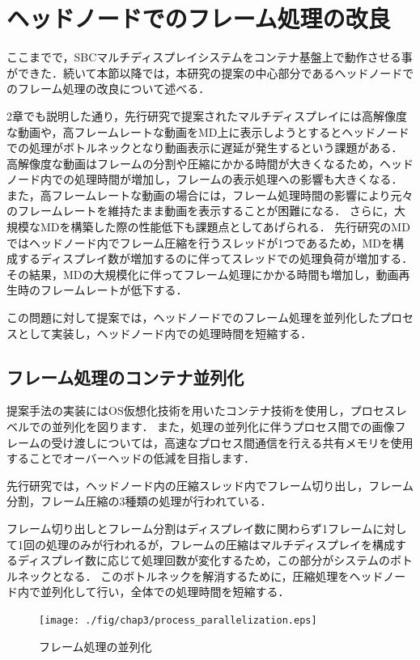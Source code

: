 \section{ヘッドノードでのフレーム処理の改良}
ここまでで，SBCマルチディスプレイシステムをコンテナ基盤上で動作させる事ができた．続いて本節以降では，本研究の提案の中心部分であるヘッドノードでのフレーム処理の改良について述べる．

2章でも説明した通り，先行研究で提案されたマルチディスプレイには高解像度な動画や，高フレームレートな動画をMD上に表示しようとするとヘッドノードでの処理がボトルネックとなり動画表示に遅延が発生するという課題がある．
高解像度な動画はフレームの分割や圧縮にかかる時間が大きくなるため，ヘッドノード内での処理時間が増加し，フレームの表示処理への影響も大きくなる．
また，高フレームレートな動画の場合には，フレーム処理時間の影響により元々のフレームレートを維持たまま動画を表示することが困難になる．
さらに，大規模なMDを構築した際の性能低下も課題点としてあげられる．
先行研究のMDではヘッドノード内でフレーム圧縮を行うスレッドが1つであるため，MDを構成するディスプレイ数が増加するのに伴ってスレッドでの処理負荷が増加する．
その結果，MDの大規模化に伴ってフレーム処理にかかる時間も増加し，動画再生時のフレームレートが低下する．

この問題に対して提案では，ヘッドノードでのフレーム処理を並列化したプロセスとして実装し，ヘッドノード内での処理時間を短縮する．

\subsection*{フレーム処理のコンテナ並列化}
提案手法の実装にはOS仮想化技術を用いたコンテナ技術を使用し，プロセスレベルでの並列化を図ります．
また，処理の並列化に伴うプロセス間での画像フレームの受け渡しについては，高速なプロセス間通信を行える共有メモリを使用することでオーバーヘッドの低減を目指します．

先行研究では，ヘッドノード内の圧縮スレッド内でフレーム切り出し，フレーム分割，フレーム圧縮の3種類の処理が行われている．

フレーム切り出しとフレーム分割はディスプレイ数に関わらず1フレームに対して1回の処理のみが行われるが，フレームの圧縮はマルチディスプレイを構成するディスプレイ数に応じて処理回数が変化するため，この部分がシステムのボトルネックとなる．
このボトルネックを解消するために，圧縮処理をヘッドノード内で並列化して行い，全体での処理時間を短縮する．

\begin{figure}[H]
    \hspace*{\fill}
    \texttt{[image: ./fig/chap3/process\_parallelization.eps]}
    \hspace*{\fill}
    \caption{フレーム処理の並列化}
\end{figure}


